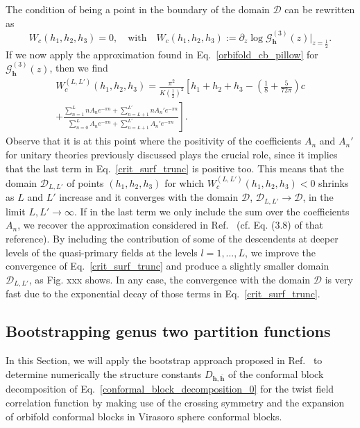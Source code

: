 \documentclass[a4paper,11pt]{article}
\begin{document}
The condition of being a point in the boundary of  the domain $\mathscr{D}$
can be rewritten as
\begin{equation}
 W_c(h_1, h_2, h_3)=0,\quad \text{with}\quad 
 W_c(h_1, h_2, h_3):=\partial_z\log\mathcal{G}_{\boldsymbol{h}}^{(3)}(z)\Bigr|_{z=\frac{1}{2}}.
\end{equation}
If we now apply the approximation found in Eq.~\eqref{orbifold_cb_pillow} for 
$\mathcal{G}_{\boldsymbol{h}}^{(3)}(z)$, then we find
\begin{multline}\label{crit_surf_trunc}
 W_c^{(L, L')}(h_1, h_2, h_3)=
 \frac{\pi^2}{K(\frac{1}{2})^2}
 \left[h_1+h_2+h_3-\left(\frac{1}{8}+\frac{5}{72\pi}\right)c\right. \\
 \left.+\frac{\sum_{n=1}^L n A_n e^{-\pi n}+\sum_{n=L+1}^{L'} n A_n'e^{-\pi n}}
 {\sum_{n=0}^L A_n e^{-\pi n}+\sum_{n=L+1}^{L'} A_n' e^{-\pi n}}\right]. 
\end{multline}
Observe that it is at this point where the positivity of the coefficients $A_n$ 
and $A_n'$ for unitary theories previously discussed plays the crucial role, since 
it implies that the last term in Eq.~\eqref{crit_surf_trunc} is positive too. This means that the 
domain $\mathscr{D}_{L, L'}$ of points $(h_1, h_2, h_3)$ for which $W_c^{(L, L')}(h_1, h_2, h_3)<0$
shrinks as $L$ and $L'$ increase and it converges with the domain $\mathscr{D}$, $\mathscr{D}_{L, L'}\to\mathscr{D}$,
in the limit $L, L'\to\infty$. If in the last term we only include the sum over the coefficients 
$A_n$, we recover the approximation considered in Ref.~\cite{Collier} (cf. Eq. (3.8) of that reference). 
By including the contribution of some of the descendents at deeper levels of the quasi-primary fields at 
the levels $l=1, \dots, L$, we improve the convergence of Eq.~\eqref{crit_surf_trunc} and produce a slightly smaller domain 
$\mathscr{D}_{L, L'}$, as Fig. xxx shows. In any case, the convergence with the domain $\mathscr{D}$ is 
very fast due to the exponential decay of those terms in Eq.~\eqref{crit_surf_trunc}.


\subsection{Bootstrapping genus two partition functions}


In this Section, we will apply the bootstrap approach proposed in Ref.~\cite{SR} 
to determine numerically the structure constants $D_{\boldsymbol{h}, \boldsymbol{\bar{h}}}$ of the conformal block decomposition 
of Eq.~\eqref{conformal_block_decomposition_0} for the twist field correlation function by making use of 
the crossing symmetry and the expansion of orbifold conformal blocks 
in Virasoro sphere conformal blocks.
\end{document}

